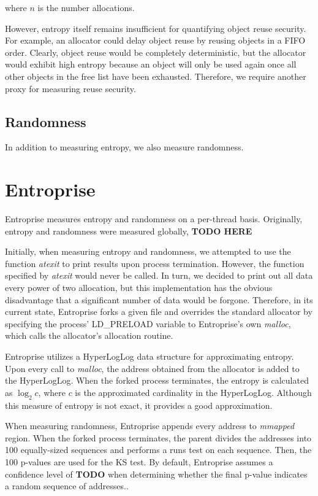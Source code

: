 \documentclass[11pt]{article}
\begin{document}
\begin{multicols*}{2}
\noindent where \( n \) is the number allocations.

However, entropy itself remains insufficient for quantifying object reuse security.
For example, an allocator could delay object reuse by reusing objects in a FIFO order.
Clearly, object reuse would be completely deterministic, but the allocator would exhibit high entropy because an object will only be used again once all other objects in the free list have been exhausted.
Therefore, we require another proxy for measuring reuse security.

\subsection{Randomness}

\noindent In addition to measuring entropy, we also measure randomness.

\section{Entroprise}

\noindent Entroprise measures entropy and randomness on a per-thread basis. Originally, entropy and randomness were measured globally, \textbf{TODO HERE}

Initially, when measuring entropy and randomness, we attempted to use the function \textit{atexit} to print results upon process termination.
However, the function specified by \textit{atexit} would never be called.
In turn, we decided to print out all data every power of two allocation, but this implementation has the obvious disadvantage that a significant number of data would be forgone.
Therefore, in its current state, Entroprise forks a given file and overrides the standard allocator by specifying the process' LD\_PRELOAD variable to Entroprise's own \textit{malloc}, which calls the allocator's allocation routine.

Entroprise utilizes a HyperLogLog data structure for approximating entropy. 
Upon every call to \textit{malloc}, the address obtained from the allocator is added to the HyperLogLog.
When the forked process terminates, the entropy is calculated as \( \log_2c \), where \( c \) is the approximated cardinality in the HyperLogLog.
Although this measure of entropy is not exact, it provides a good approximation.

When measuring randomness, Entroprise appends every address to \textit{mmapped} region.
When the forked process terminates, the parent divides the addresses into 100 equally-sized sequences and performs a runs test on each sequence.
Then, the 100 p-values are used for the KS test. By default, Entroprise assumes a confidence level of \textbf{TODO} when determining whether the final p-value indicates a random sequence of addresses..


\end{multicols*}
\end{document}

